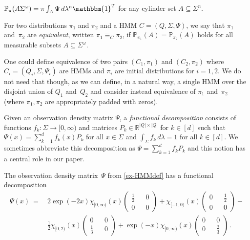 \documentclass[a4paper,UKenglish,cleveref, autoref,mathscr]{lipics-v2019}
\newcommand{\RR}{\mathbb{R}}
\newcommand{\PP}{\mathbb{P}}
\newcommand{\1}{\mathbbm{1}}
\begin{document}
$\PP_\pi(A \Sigma^\omega) =  \pi \int_A \Psi\, d\lambda^n \1^T$
for any cylinder set $A \subseteq \Sigma^n$.
\begin{definition}
For two distributions $\pi_1$ and $\pi_2$ and a HMM $C = (Q, \Sigma, \Psi)$, we say that $\pi_1$ and~$\pi_2$ are \emph{equivalent}, written $\pi_1 \equiv_C \pi_2$, if $\PP_{\pi_1}(A) = \PP_{\pi_2}(A)$ holds for all measurable subsets $A \subseteq \Sigma^\omega$.
\end{definition}
One could define equivalence of two pairs $(C_1,\pi_1)$ and $(C_2,\pi_2)$ where $C_i = (Q_i, \Sigma, \Psi_i)$ are HMMs and $\pi_i$ are initial distributions for $i=1,2$.
We do not need that though, as we can define, in a natural way, a single HMM over the disjoint union of $Q_1$ and~$Q_2$ and consider instead equivalence of $\pi_1$ and~$\pi_2$ (where $\pi_1,\pi_2$ are appropriately padded with zeros).

Given an observation density matrix $\Psi$, a \emph{functional decomposition} consists of functions $f_k : \Sigma \rightarrow [0,\infty)$ and matrices $P_k \in \RR^{|Q| \times |Q|}$ for $k \in [d]$ such that $\Psi(x) = \sum_{k = 1}^d f_k(x) P_k$ for all $x \in \Sigma$ and $\int_{\Sigma} f_k\, d\lambda = 1$ for all $k \in [d]$. We sometimes abbreviate this decomposition as $\Psi = \sum_{k = 1}^d f_k P_k$ and this notion has a central role in our paper.

\begin{example} \label{ex-functional-decomposition}
The observation density matrix~$\Psi$ from \cref{ex-HMMdef} has a functional decomposition
\begin{align*}
\Psi(x) \ = \
& 2 \exp(-2 x) \chi_{[0,\infty)}(x)
\begin{pmatrix}
\frac12 && 0 \\ 0 && 0
\end{pmatrix}
+
\chi_{[-1,0)}(x)
\begin{pmatrix}
0 && \frac12 \\ 0 && 0
\end{pmatrix}
+ \mbox{} \\
& \frac12 \chi_{[0,2)}(x)
\begin{pmatrix}
0 && 0 \\
\frac13 && 0
\end{pmatrix}
+
\exp(-x) \chi_{[0,\infty)}(x)
\begin{pmatrix}
0 && 0 \\
0 && \frac23
\end{pmatrix}
\,. \tag*{\qed}
\end{align*}
\end{example}
\end{document}
